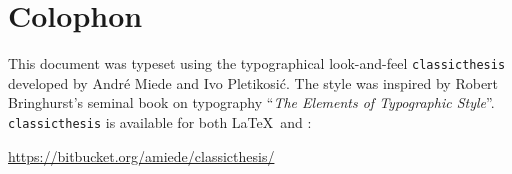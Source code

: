 \pagestyle{empty}

\hfill

\vfill


\section*{Colophon}
This document was typeset using the typographical look-and-feel \texttt{classicthesis} developed by Andr\'e Miede and Ivo Pletikosić.
The style was inspired by Robert Bringhurst's seminal book on typography ``\emph{The Elements of Typographic Style}''.
\texttt{classicthesis} is available for both \LaTeX\ and \mLyX:
\begin{center}
\url{https://bitbucket.org/amiede/classicthesis/}
\end{center}
